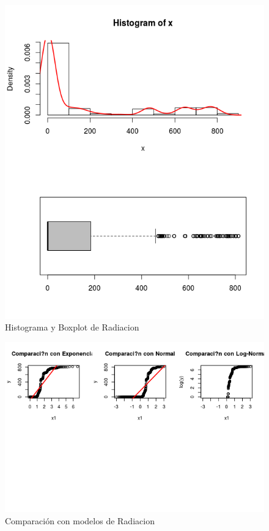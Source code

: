 \documentclass{article}
\begin{document}
\begin{enumerate}[a)]
\begin{figure}[h!]
\centering
\includegraphics[scale=0.5]{./figures/histplot_Radiacion.png}
\caption{Histograma y Boxplot de Radiacion}
\end{figure}

\begin{figure}[h!]
\centering
\includegraphics[scale=0.5]{./figures/cm_Radiacion.png}
\caption{Comparación con modelos de Radiacion}
\end{figure}


\end{enumerate}
\end{document}
